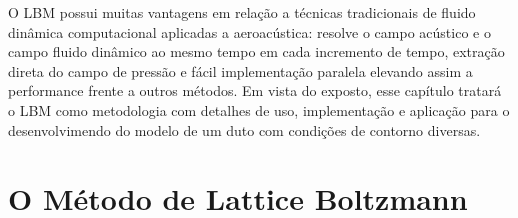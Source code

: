 O LBM possui muitas vantagens em relação a técnicas tradicionais de fluido dinâmica computacional aplicadas a aeroacústica: resolve o campo acústico e o campo fluido dinâmico ao mesmo tempo em cada incremento de tempo, extração direta do campo de pressão e fácil implementação paralela elevando assim a performance frente a outros métodos. Em vista do exposto, esse capítulo tratará o LBM como metodologia com detalhes de uso, implementação e aplicação para o desenvolvimendo do modelo de um duto com condições de contorno diversas.

\section{O Método de Lattice Boltzmann}


